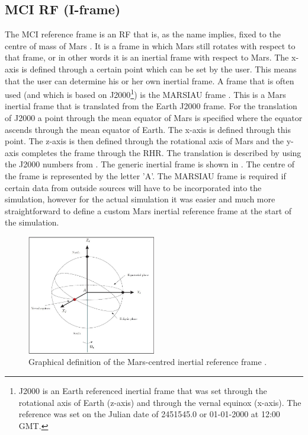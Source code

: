 \subsection{\acl{MCI} \ac{RF} (I-frame)}
\label{subsec:ECI}
The \acf{MCI} reference frame is an \ac{RF} that is, as the name implies, fixed to the centre of mass of Mars \citep{mooij2013fd}. It is a frame in which Mars still rotates with respect to that frame, or in other words it is an inertial frame with respect to Mars. The x-axis is defined through a certain point which can be set by the user. This means that the user can determine his or her own inertial frame. A frame that is often used (and which is based on J2000\footnote{J2000 is an Earth referenced inertial frame that was set through the rotational axis of Earth (z-axis) and through the vernal equinox (x-axis). The reference was set on the Julian date of 2451545.0 or 01-01-2000 at 12:00 \ac{GMT}.}) is the MARSIAU frame \citep{bachman2014naif,diaz2008generic}. This is a Mars inertial frame that is translated from the Earth J2000 frame. For the translation of J2000 a point through the mean equator of Mars is specified where the equator ascends through the mean equator of Earth. The x-axis is defined through this point. The z-axis is then defined through the rotational axis of Mars and the y-axis completes the frame through the \ac{RHR}. The translation is described by \cite{bachman2014naif,diaz2008generic} using the J2000 numbers from \cite{archinal2011report}. The generic inertial frame is shown in . The centre of the frame is represented by the letter 'A'. The MARSIAU frame is required if certain data from outside sources will have to be incorporated into the simulation, however for the actual simulation it was easier and much more straightforward to define a custom Mars inertial reference frame at the start of the simulation. 



\begin{figure}[!ht]
\centering
\includegraphics[width=0.5\textwidth]{figures/reference_frames/eci_mooij2013fd.jpg}
\caption{Graphical definition of the Mars-centred inertial reference frame \citep{mooij2013fd}.}
\label{fig:eci_mooij2013fd}
\end{figure}

